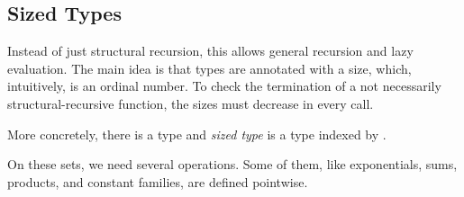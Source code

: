 \subsection{Sized Types}
Instead of just structural recursion, this allows general recursion and lazy evaluation.
The main idea is that types are annotated with a size, which, intuitively, is an ordinal number.
To check the termination of a not necessarily structural-recursive function, the sizes must decrease in every call.

More concretely, there is a type  and \emph{sized type} is a type indexed by .

\begin{code}%
\>[0]\AgdaSpace{}%
\AgdaSymbol{=}\AgdaSpace{}%
\AgdaSpace{}%
\AgdaSpace{}%
\<%
\end{code}

On these sets, we need several operations.
Some of them, like exponentials, sums, products, and constant families, are defined pointwise.

